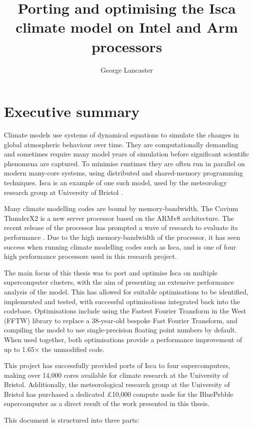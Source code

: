 \documentclass[a4paper,11pt]{report}
\title{Porting and optimising the Isca climate model on Intel and Arm processors}
\author{George Lancaster}
\begin{document}

\chapter*{Executive summary}
Climate models use systems of dynamical equations to simulate the changes in global atmospheric behaviour over time. They are computationally demanding and sometimes require many model years of simulation before significant scientific phenomena are captured. To minimise runtimes they are often run in parallel on modern many-core systems, using distributed and shared-memory programming techniques. Isca is an example of one such model, used by the meteorology research group at University of Bristol \cite{vallis2018isca}.
\par
Many climate modelling codes are bound by memory-bandwidth. The Cavium ThunderX2 is a new server processor based on the ARMv8 architecture. The recent release of the processor has prompted a wave of research to evaluate its performance \cite{calore2018advanced,mcintosh2018performance}. Due to the high memory-bandwidth of the processor, it has seen success when running climate modelling codes such as Isca, and is one of four high performance processors used in this research project.
\par
The main focus of this thesis was to port and optimise Isca on multiple supercomputer clusters, with the aim of presenting an extensive performance analysis of the model. This has allowed for suitable optimisations to be identified, implemented and tested, with successful optimisations integrated back into the codebase. Optimisations include using the Fastest Fourier Transform in the West (FFTW) library to replace a 38-year-old bespoke Fast Fourier Transform, and compiling the model to use single-precision floating point numbers by default. When used together, both optimisations provide a performance improvement of up to 1.65$\times$ the unmodified code. 
\par
This project has successfully provided ports of Isca to four supercomputers, making over 14,000 cores available for climate research at the University of Bristol. Additionally, the meteorological research group at the University of Bristol has purchased a dedicated £10,000 compute node for the BluePebble supercomputer as a direct result of the work presented in this thesis. 
\par
This document is structured into three parts:
\end{document}
